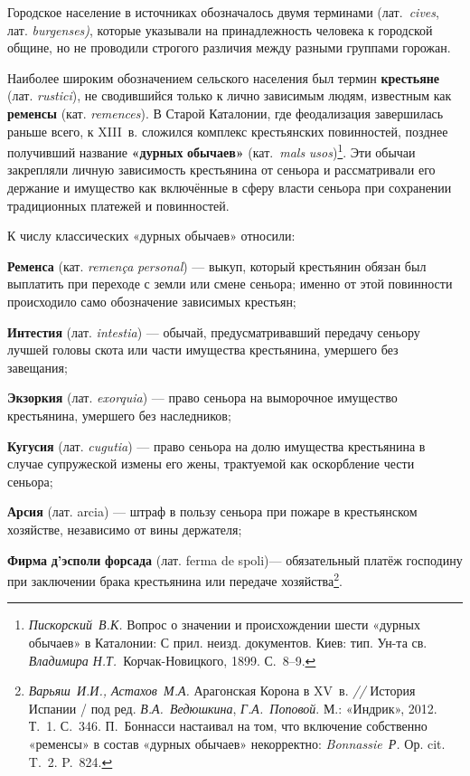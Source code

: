 Городское население в источниках обозначалось двумя терминами (лат.~\emph{cives}, лат. \emph{burgenses}\emph{)}, которые указывали на принадлежность человека к городской общине, но не проводили строгого различия между разными группами горожан.

Наиболее широким обозначением сельского населения был термин \textbf{крестьяне} (лат. \emph{rustici}), не сводившийся только к лично зависимым людям, известным как \textbf{ременсы} (кат. \emph{remences}). В Старой Каталонии, где феодализация завершилась раньше всего, к XIII~в. сложился комплекс крестьянских повинностей, позднее получивший название \textbf{«дурны}\textbf{х}\textbf{ обыча}\textbf{ев}\textbf{»} (кат.~\emph{mals}\emph{ }\emph{usos})\footnote{\emph{Пискорский}\emph{~}\emph{В.К.} Вопрос о значении и происхождении шести «дурных обычаев» в Каталонии: С прил. неизд. документов. Киев: тип. Ун-та св. \emph{Владимира Н.Т.}~Корчак-Новицкого, 1899. С.~8--9.}. Эти обычаи закрепляли личную зависимость крестьянина от сеньора и рассматривали его держание и имущество как включённые в сферу власти сеньора при сохранении традиционных платежей и повинностей.

К числу классических «дурных обычаев» относили:

\textbf{Ременса} (кат. \emph{remen}\emph{ç}\emph{a}\emph{ }\emph{personal}) --- выкуп, который крестьянин обязан был выплатить при переходе с земли или смене сеньора; именно от этой повинности происходило само обозначение зависимых крестьян;

\textbf{Интестия} (лат. \emph{intestia}) --- обычай, предусматривавший передачу сеньору лучшей головы скота или части имущества крестьянина, умершего без завещания;

\textbf{Экзоркия} (лат. \emph{exorquia}) --- право сеньора на выморочное имущество крестьянина, умершего без наследников;

\textbf{Кугусия} (лат. \emph{cugutia}) --- право сеньора на долю имущества крестьянина в случае супружеской измены его жены, трактуемой как оскорбление чести сеньора;

\textbf{Арсия} (лат. arcia) --- штраф в пользу сеньора при пожаре в крестьянском хозяйстве, независимо от вины держателя;

\textbf{Фирма }\textbf{д’эсполи}\textbf{ }\textbf{форсада} (лат. ferma de spoli)--- обязательный платёж господину при заключении брака крестьянина или передаче хозяйства\footnote{\emph{Варьяш}\emph{~}\emph{И.И., Астахов}\emph{~}\emph{М.А.} Арагонская Корона в XV~в. \emph{// }История Испании / под ред. \emph{В.А.~Ведюшкина}, \emph{Г.А.~Поповой}. М.: «Индрик», 2012. Т.~1. С.~346. П.~Боннасси настаивал на том, что включение собственно «ременсы» в состав «дурных обычаев» некорректно: \emph{Bonnassie}\emph{~}\emph{Р. }Ор. cit. T.~2. P.~824.}.

